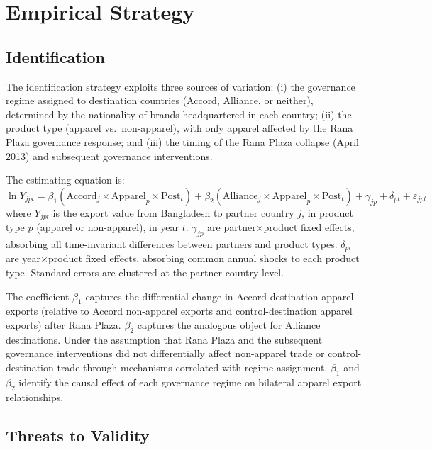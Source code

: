 \documentclass[12pt]{article}
\begin{document}
\section{Empirical Strategy}
\label{sec:strategy}

\subsection{Identification}

The identification strategy exploits three sources of variation: (i) the governance regime assigned to destination countries (Accord, Alliance, or neither), determined by the nationality of brands headquartered in each country; (ii) the product type (apparel vs.\ non-apparel), with only apparel affected by the Rana Plaza governance response; and (iii) the timing of the Rana Plaza collapse (April 2013) and subsequent governance interventions.

The estimating equation is:
\begin{equation}
\ln Y_{jpt} = \beta_1 (\text{Accord}_j \times \text{Apparel}_p \times \text{Post}_t) + \beta_2 (\text{Alliance}_j \times \text{Apparel}_p \times \text{Post}_t) + \gamma_{jp} + \delta_{pt} + \varepsilon_{jpt}
\label{eq:ddd}
\end{equation}
where $Y_{jpt}$ is the export value from Bangladesh to partner country $j$, in product type $p$ (apparel or non-apparel), in year $t$. $\gamma_{jp}$ are partner$\times$product fixed effects, absorbing all time-invariant differences between partners and product types. $\delta_{pt}$ are year$\times$product fixed effects, absorbing common annual shocks to each product type. Standard errors are clustered at the partner-country level.

The coefficient $\beta_1$ captures the differential change in Accord-destination apparel exports (relative to Accord non-apparel exports and control-destination apparel exports) after Rana Plaza. $\beta_2$ captures the analogous object for Alliance destinations. Under the assumption that Rana Plaza and the subsequent governance interventions did not differentially affect non-apparel trade or control-destination trade through mechanisms correlated with regime assignment, $\beta_1$ and $\beta_2$ identify the causal effect of each governance regime on bilateral apparel export relationships.

\subsection{Threats to Validity}
\end{document}
